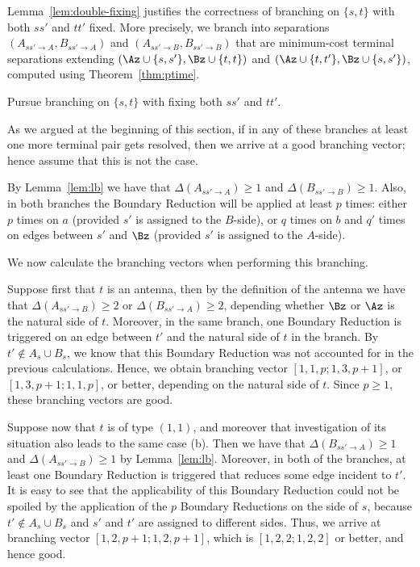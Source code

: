 Lemma~\ref{lem:double-fixing} justifies the correctness of branching on $\{s,t\}$ with both $ss'$ and $tt'$ fixed. More precisely, we branch into separations $(A_{ss'\to A},B_{ss'\to A})$ and $(A_{ss'\to B},B_{ss'\to B})$ that are minimum-cost terminal separations extending $(\Az\cup \{s,s'\},\Bz\cup \{t,t\})$ and $(\Az\cup \{t,t'\},\Bz\cup \{s,s'\})$, computed using Theorem~\ref{thm:ptime}. 

\begin{branching}
Pursue branching on $\{s,t\}$ with fixing both $ss'$ and $tt'$.
\end{branching}

As we argued at the beginning of this section, if in any of these branches at least one more terminal pair gets resolved, then we arrive at a good branching vector; hence assume that this is not the case.

By Lemma~\ref{lem:lb} we have that $\Delta(A_{ss'\to A})\geq 1$ and $\Delta(B_{ss'\to B})\geq 1$. Also, in both branches the Boundary Reduction will be applied at least $p$ times: either $p$ times on $a$ (provided $s'$ is assigned to the $B$-side), or $q$ times on $b$ and $q'$ times on edges between $s'$ and $\Bz$ (provided $s'$ is assigned to the $A$-side).

We now calculate the branching vectors when performing this branching.

Suppose first that $t$ is an antenna, then by the definition of the antenna we have that $\Delta(A_{ss'\to B})\geq 2$ or $\Delta(B_{ss'\to A})\geq 2$, depending whether $\Bz$ or $\Az$ is the natural side of $t$. Moreover, in the same branch, one Boundary Reduction is triggered on an edge between $t'$ and the natural side of $t$ in the branch. By $t'\notin A_s\cup B_s$, we know that this Boundary Reduction was not accounted for in the previous calculations. Hence, we obtain branching vector $[1,1,p;1,3,p+1]$, or $[1,3,p+1;1,1,p]$, or better, depending on the natural side of $t$. Since $p\geq 1$, these branching vectors are good.

Suppose now that $t$ is of type $(1,1)$, and moreover that investigation of its situation also leads to the same case (b). Then we have that $\Delta(B_{ss'\to A})\geq 1$ and $\Delta(A_{ss'\to B})\geq 1$ by Lemma~\ref{lem:lb}. Moreover, in both of the branches, at least one Boundary Reduction is triggered that reduces some edge incident to $t'$. It is easy to see that the applicability of this Boundary Reduction could not be spoiled by the application of the $p$ Boundary Reductions on the side of $s$, because $t'\notin A_s\cup B_s$ and $s'$ and $t'$ are assigned to different sides. Thus, we arrive at branching vector $[1,2,p+1;1,2,p+1]$, which is $[1,2,2;1,2,2]$ or better, and hence good.

